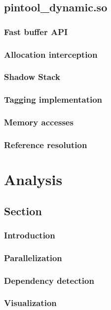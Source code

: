 \subsection{pintool\_dynamic.so}
\subsubsection{Fast buffer API}
\subsubsection{Allocation interception}
\subsubsection{Shadow Stack}
\subsubsection{Tagging implementation}
\subsubsection{Memory accesses}
\subsubsection{Reference resolution}

\section{Analysis}

\subsection{Section}
\subsubsection{Introduction}
\subsubsection{Parallelization}
\subsubsection{Dependency detection}
\subsubsection{Visualization}

